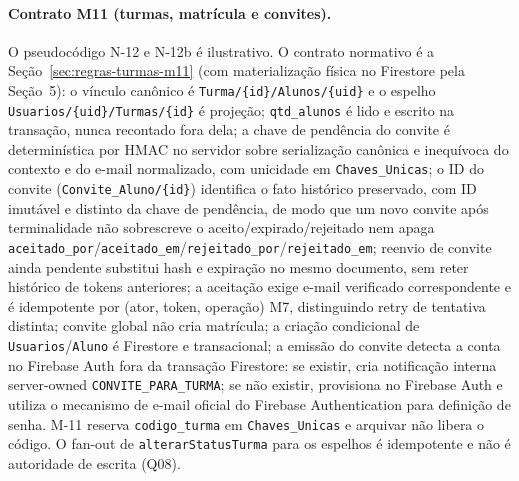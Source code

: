 \paragraph{Contrato M11 (turmas, matrícula e convites).}
O pseudocódigo N-12 e N-12b é ilustrativo. O contrato normativo é a
Seção~\ref{sec:regras-turmas-m11} (com materialização física no Firestore pela Seção~5): o vínculo canônico é
\texttt{Turma/\{id\}/Alunos/\{uid\}} e o espelho
\texttt{Usuarios/\{uid\}/Turmas/\{id\}} é projeção; \texttt{qtd\_alunos} é lido
e escrito na transação, nunca recontado fora dela; a chave de pendência do convite é
determinística por HMAC no servidor sobre serialização canônica e inequívoca do contexto e do e-mail normalizado, com unicidade em
\texttt{Chaves\_Unicas}; o ID do convite (\texttt{Convite\_Aluno/\{id\}}) identifica o fato histórico preservado, com ID imutável e distinto da chave de
pendência, de modo que um novo convite após terminalidade não sobrescreve o
aceito/expirado/rejeitado nem apaga \texttt{aceitado\_por}/\texttt{aceitado\_em}/\texttt{rejeitado\_por}/\texttt{rejeitado\_em}; reenvio de convite ainda pendente substitui hash e expiração no mesmo documento, sem reter histórico de tokens anteriores; a
aceitação exige e-mail verificado correspondente e é idempotente por (ator,
token, operação) M7, distinguindo retry de tentativa distinta; convite global
não cria matrícula; a criação condicional de \texttt{Usuarios}/\texttt{Aluno} é
Firestore e transacional; a emissão do convite detecta a conta no Firebase Auth fora da transação Firestore: se existir, cria notificação interna server-owned \texttt{CONVITE\_PARA\_TURMA}; se não existir, provisiona no Firebase Auth e utiliza o mecanismo de e-mail oficial do Firebase Authentication para definição de senha. M-11 reserva \texttt{codigo\_turma} em
\texttt{Chaves\_Unicas} e arquivar não libera o código. O fan-out de
\texttt{alterarStatusTurma} para os espelhos é idempotente e não é autoridade
de escrita (Q08).

